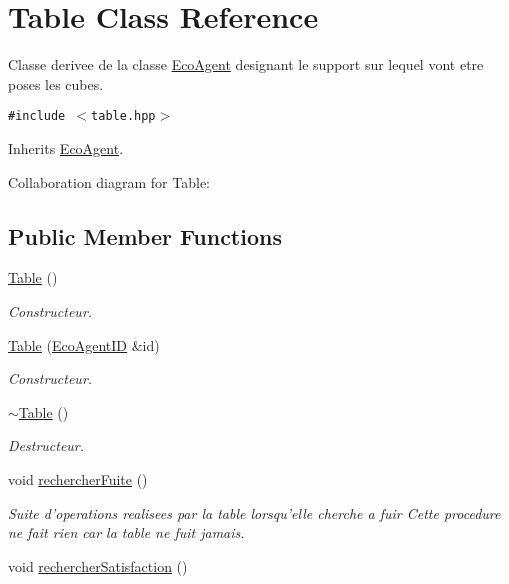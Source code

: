 \hypertarget{classTable}{
\section{Table Class Reference}
\label{classTable}
}
Classe derivee de la classe \hyperlink{classEcoAgent}{EcoAgent} designant le support sur lequel vont etre poses les cubes.  


{\tt \#include $<$table.hpp$>$}

Inherits \hyperlink{classEcoAgent}{EcoAgent}.

Collaboration diagram for Table:\subsection*{Public Member Functions}
\begin{CompactItemize}
\item 
\hyperlink{classTable_049f2e06391781ae255c6698869c4ad1}{Table} ()
\begin{CompactList}\small\item\em Constructeur. \item\end{CompactList}\item 
\hyperlink{classTable_f82a6d490aa166537ac2e42e83ec8cd3}{Table} (\hyperlink{classEcoAgentID}{EcoAgentID} \&id)
\begin{CompactList}\small\item\em Constructeur. \item\end{CompactList}\item 
\hyperlink{classTable_9a559f2e7beb37b511ee9f88873164f8}{$\sim$Table} ()
\begin{CompactList}\small\item\em Destructeur. \item\end{CompactList}\item 
\hypertarget{classTable_e5da6b33fc4bfa706559b50668b3e5b4}{
void \hyperlink{classTable_e5da6b33fc4bfa706559b50668b3e5b4}{rechercherFuite} ()}
\label{classTable_e5da6b33fc4bfa706559b50668b3e5b4}

\begin{CompactList}\small\item\em Suite d'operations realisees par la table lorsqu'elle cherche a fuir Cette procedure ne fait rien car la table ne fuit jamais. \item\end{CompactList}\item 
\hypertarget{classTable_3fc58e0af8f075440c9184f674e1d02e}{
void \hyperlink{classTable_3fc58e0af8f075440c9184f674e1d02e}{rechercherSatisfaction} ()}
\label{classTable_3fc58e0af8f075440c9184f674e1d02e}


\end{CompactItemize}

